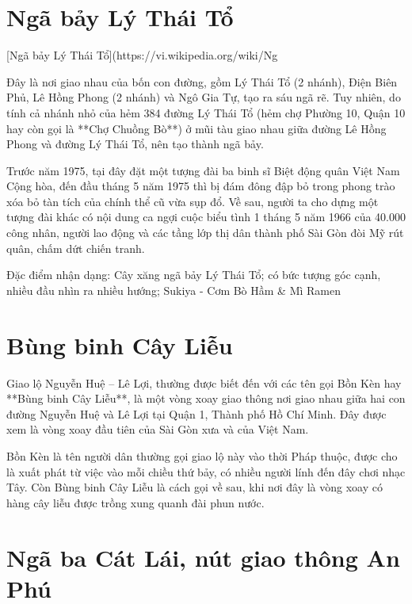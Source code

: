 \section{Ngã bảy Lý Thái Tổ}

[Ngã bảy Lý Thái Tổ](https://vi.wikipedia.org/wiki/Ng%

Đây là nơi giao nhau của bốn con đường, gồm Lý Thái Tổ (2 nhánh), Điện Biên Phủ, Lê Hồng Phong (2 nhánh) và Ngô Gia Tự, tạo ra sáu ngã rẽ. Tuy nhiên, do tính cả nhánh nhỏ của hẻm 384 đường Lý Thái Tổ (hẻm chợ Phường 10, Quận 10 hay còn gọi là **Chợ Chuồng Bò**) ở mũi tàu giao nhau giữa đường Lê Hồng Phong và đường Lý Thái Tổ, nên tạo thành ngã bảy.

Trước năm 1975, tại đây đặt một tượng đài ba binh sĩ Biệt động quân Việt Nam Cộng hòa, đến đầu tháng 5 năm 1975 thì bị đám đông đập bỏ trong phong trào xóa bỏ tàn tích của chính thể cũ vừa sụp đổ. Về sau, người ta cho dựng một tượng đài khác có nội dung ca ngợi cuộc biểu tình 1 tháng 5 năm 1966 của 40.000 công nhân, người lao động và các tầng lớp thị dân thành phố Sài Gòn đòi Mỹ rút quân, chấm dứt chiến tranh.

Đặc điểm nhận dạng: Cây xăng ngã bảy Lý Thái Tổ; có bức tượng góc cạnh, nhiều đầu nhìn ra nhiều hướng; Sukiya - Cơm Bò Hầm & Mì Ramen

\section{Bùng binh Cây Liễu}

Giao lộ Nguyễn Huệ – Lê Lợi, thường được biết đến với các tên gọi Bồn Kèn hay **Bùng binh Cây Liễu**, là một vòng xoay giao thông nơi giao nhau giữa hai con đường Nguyễn Huệ và Lê Lợi tại Quận 1, Thành phố Hồ Chí Minh. Đây được xem là vòng xoay đầu tiên của Sài Gòn xưa và của Việt Nam.

Bồn Kèn là tên người dân thường gọi giao lộ này vào thời Pháp thuộc, được cho là xuất phát từ việc vào mỗi chiều thứ bảy, có nhiều người lính đến đây chơi nhạc Tây. Còn Bùng binh Cây Liễu là cách gọi về sau, khi nơi đây là vòng xoay có hàng cây liễu được trồng xung quanh đài phun nước.

\section{Ngã ba Cát Lái, nút giao thông An Phú}

